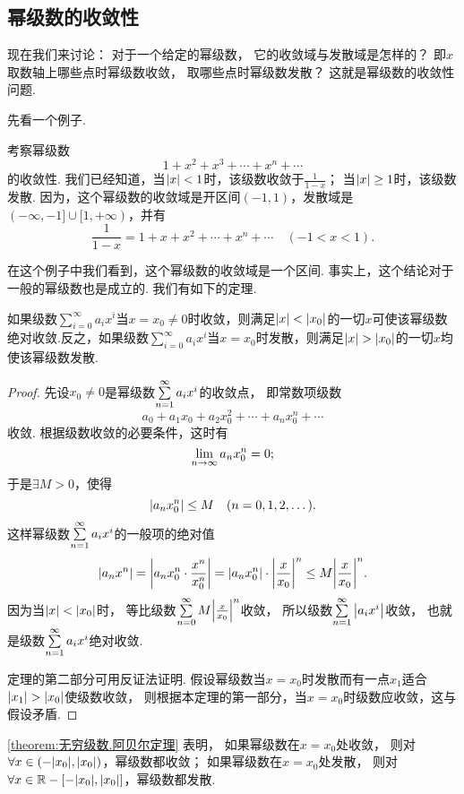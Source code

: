\subsection{幂级数的收敛性}
现在我们来讨论：
对于一个给定的幂级数，
它的收敛域与发散域是怎样的？
即\(x\)取数轴上哪些点时幂级数收敛，
取哪些点时幂级数发散？
这就是幂级数的收敛性问题.

先看一个例子.
\begin{example}
考察幂级数\[
1+x^2+x^3+\dotsb+x^n+\dotsb
\]的收敛性.
我们已经知道，当\(\abs{x}<1\)时，该级数收敛于\(\frac{1}{1-x}\)；
当\(\abs{x}\geq1\)时，该级数发散.
因为，这个幂级数的收敛域是开区间\((-1,1)\)，发散域是\((-\infty,-1]\cup[1,+\infty)\)，并有\[
\frac{1}{1-x} = 1+x+x^2+\dotsb+x^n+\dotsb
\quad(-1<x<1).
\]
\end{example}

在这个例子中我们看到，这个幂级数的收敛域是一个区间.
事实上，这个结论对于一般的幂级数也是成立的.
我们有如下的定理.

\begin{theorem}[阿贝尔定理]\label{theorem:无穷级数.阿贝尔定理}
如果级数\(\sum\limits_{i=0}^\infty a_i x^i\)当\(x=x_0\neq0\)时收敛，则满足\(\abs{x}<\abs{x_0}\)的一切\(x\)可使该幂级数绝对收敛.反之，如果级数\(\sum\limits_{i=0}^\infty a_i x^i\)当\(x=x_0\)时发散，则满足\(\abs{x}>\abs{x_0}\)的一切\(x\)均使该幂级数发散.
\begin{proof}
先设\(x_0\neq0\)是幂级数\(\sum\limits_{n=1}^\infty a_i x^i\)的收敛点，
即常数项级数\[
a_0 + a_1 x_0 + a_2 x_0^2 + \dotsb + a_n x_0^n + \dotsb
\]收敛.
根据级数收敛的必要条件，这时有\[
\lim\limits_{n\to\infty} a_n x_0^n = 0;
\]
于是\(\exists M > 0\)，使得\[
\abs{a_n x_0^n} \leq M
\quad(n=0,1,2,\dotsc).
\]
这样幂级数\(\sum\limits_{n=1}^\infty a_i x^i\)的一般项的绝对值\[
\abs{a_n x^n} = \abs{a_n x_0^n \cdot \frac{x^n}{x_0^n}}
= \abs{a_n x_0^n} \cdot \abs{\frac{x}{x_0}}^n
\leq M \abs{\frac{x}{x_0}}^n.
\]
因为当\(\abs{x}<\abs{x_0}\)时，
等比级数\(\sum\limits_{n=0}^\infty M \abs{\frac{x}{x_0}}^n\)收敛，
所以级数\(\sum\limits_{n=1}^\infty \abs{a_i x^i}\)收敛，
也就是级数\(\sum\limits_{n=1}^\infty a_i x^i\)绝对收敛.

定理的第二部分可用反证法证明.
假设幂级数当\(x=x_0\)时发散而有一点\(x_1\)适合\(\abs{x_1}>\abs{x_0}\)使级数收敛，
则根据本定理的第一部分，当\(x=x_0\)时级数应收敛，这与假设矛盾.
\end{proof}
\end{theorem}

\cref{theorem:无穷级数.阿贝尔定理} 表明，
如果幂级数在\(x=x_0\)处收敛，
则对\(\forall x\in(-\abs{x_0},\abs{x_0})\)，幂级数都收敛；
如果幂级数在\(x=x_0\)处发散，
则对\(\forall x\in\mathbb{R}-[-\abs{x_0},\abs{x_0}]\)，幂级数都发散.

